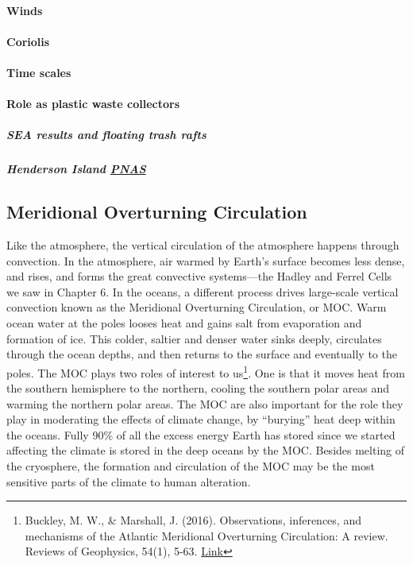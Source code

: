 {\paragraph{Winds}
\paragraph{Coriolis}
\paragraph{Time scales}
\paragraph{Role as plastic waste collectors}
\subparagraph{SEA results and floating trash rafts}
\subparagraph{Henderson Island \href{http://www.pnas.org/content/114/23/6052.short?ssource=mfr&rss=1}{PNAS}}


\subsection{Meridional Overturning Circulation}\label{MOCs}
Like the atmosphere, the vertical circulation of the atmosphere happens through convection. In the atmosphere, air warmed by Earth's surface becomes less dense, and rises, and forms the great convective systems---the Hadley and Ferrel  Cells we saw in Chapter 6. In the oceans, a different process drives large-scale vertical convection known as the Meridional Overturning Circulation, or MOC. Warm ocean water at the poles looses heat and gains salt from evaporation and formation of ice. This colder, saltier and denser water sinks deeply, circulates through the ocean depths, and then returns to the surface and eventually to the poles. The MOC plays two roles of interest to us\footnote{Buckley, M. W., \& Marshall, J. (2016). Observations, inferences, and mechanisms of the Atlantic Meridional Overturning Circulation: A review. Reviews of Geophysics, 54(1), 5-63. \href{https://doi.org/10.1002/2015RG000493}{Link}
}. One is that it moves heat from the southern hemisphere to the northern, cooling the southern polar areas and warming the northern polar areas. The MOC are also important for the role they play in moderating the effects of climate change, by ``burying'' heat deep within the oceans. Fully 90\% of all the excess energy Earth has stored since we started affecting the climate is stored in the deep oceans by the MOC. Besides melting of the cryosphere, the formation and circulation of the MOC may be the most sensitive parts of the climate to human alteration.    
}
